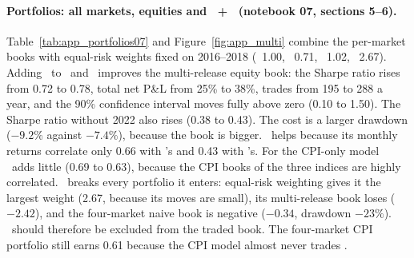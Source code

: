 \paragraph{Portfolios: all markets, equities and \ES\ + \NQ\ (notebook 07, sections 5--6).}
Table~\ref{tab:app_portfolios07} and Figure~\ref{fig:app_multi} combine the per-market books with
equal-risk weights fixed on 2016--2018 (\ES\ 1.00, \NQ\ 0.71, \YM\ 1.02, \ZN\ 2.67). Adding \YM\ to \ES\ and
\NQ\ improves the multi-release equity book: the Sharpe ratio rises from 0.72 to 0.78, total net P\&L
from 25\% to 38\%, trades from 195 to 288 a year, and the 90\% confidence interval moves fully above
zero (0.10 to 1.50). The Sharpe ratio without 2022 also rises (0.38 to 0.43). The cost is a larger
drawdown ($-9.2\%$ against $-7.4\%$), because the book is bigger. \YM\ helps because its monthly
returns correlate only 0.66 with \ES's and 0.43 with \NQ's. For the CPI-only model \YM\ adds little
(0.69 to 0.63), because the CPI books of the three indices are highly correlated. \ZN\ breaks every
portfolio it enters: equal-risk weighting gives it the largest weight (2.67, because its moves are
small), its multi-release book loses ($-2.42$), and the four-market naive book is negative ($-0.34$,
drawdown $-23\%$). \ZN\ should therefore be excluded from the traded book. The four-market CPI
portfolio still earns 0.61 because the CPI model almost never trades \ZN.

